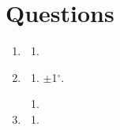 \documentclass[12pt]{report}
\begin{document}
\section{Questions}
\begin{enumerate}
	  \item
 	 \begin{enumerate}
  		  \item 
  	\end{enumerate}
 
	\item
	\begin{enumerate}
		\item  $\pm$1$^{\circ}$.
	\end{enumerate}


	\items
	 \begin{enumerate}
		\item 
	\end{enumerate}

	\item
	\begin{enumerate}
		\item
	\end{enumerate}

\end{enumerate}
\end{document}
